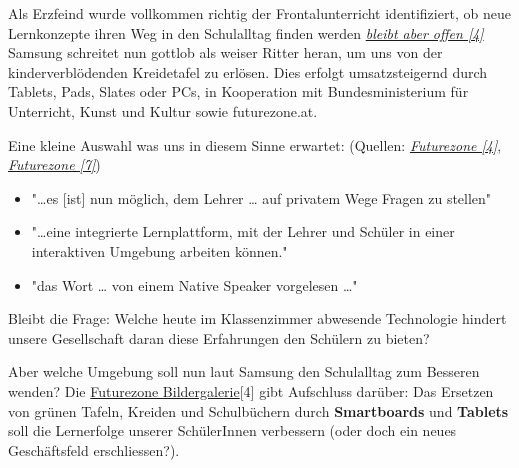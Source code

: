 \documentclass[10pt,a4paper,ngerman,twoside]{article} %
\begin{document}
Als Erzfeind wurde vollkommen richtig der Frontalunterricht identifiziert, ob neue Lernkonzepte ihren Weg in den Schulalltag finden werden \href{http://futurezone.at/digitallife/14938-gesucht-die-smarte-schule-von-morgen.php}{\textit{bleibt aber offen [4]}}
Samsung schreitet nun gottlob als weiser Ritter heran, um uns von der kinderverblödenden Kreidetafel zu erlösen. Dies erfolgt umsatzsteigernd durch Tablets, Pads, Slates oder PCs, in Kooperation mit Bundesministerium für Unterricht, Kunst und Kultur sowie futurezone.at.

Eine kleine Auswahl was uns in diesem Sinne erwartet: (Quellen: \href{http://futurezone.at/digitallife/14938-gesucht-die-smarte-schule-von-morgen.php}{\textit{Futurezone [4]}},
\href{http://futurezone.at/digitallife/14960-tablet-und-pc-klassen-als-vorzeigeprojekte.php}{\textit{Futurezone [7]}})


\begin{itemize}
  \item "…es [ist] nun möglich, dem Lehrer … auf privatem Wege Fragen zu stellen"
  \item "…eine integrierte Lernplattform, mit der Lehrer und Schüler in einer interaktiven Umgebung arbeiten können."
  \item "das Wort … von einem Native Speaker vorgelesen …"
\end{itemize}

Bleibt die Frage: Welche heute im Klassenzimmer abwesende Technologie hindert unsere Gesellschaft daran diese Erfahrungen den Schülern zu bieten?

Aber welche Umgebung soll nun laut Samsung den Schulalltag zum Besseren wenden?
Die \href{http://futurezone.at/digitallife/14938-gesucht-die-smarte-schule-von-morgen.php}{Futurezone  Bildergalerie}[4] gibt Aufschluss darüber: Das Ersetzen von grünen Tafeln, Kreiden und Schulbüchern durch \textbf{Smartboards} und \textbf{Tablets} soll die Lernerfolge unserer SchülerInnen verbessern (oder doch ein neues Geschäftsfeld erschliessen?).
\end{document}

